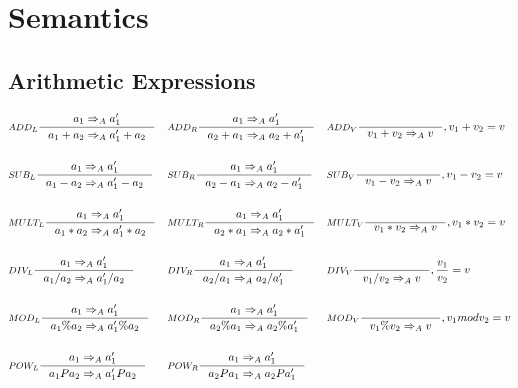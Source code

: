\section{Semantics}
\subsection{Arithmetic Expressions}
\begin{align*}
&\inference[$ADD_L$]{a_1 \Rightarrow_A a_1'}
                    {a_1 + a_2 \Rightarrow_A a_1' + a_2}
&
&\inference[$ADD_R$]{a_1 \Rightarrow_A a_1'}
										{a_2 + a_1 \Rightarrow_A a_2 + a_1'}
&
&\inference[$ADD_V$]{}
                    {v_1 + v_2 \Rightarrow_A v}
										{, v_1 + v_2 = v}
\\\\
&\inference[$SUB_L$]{a_1 \Rightarrow_A a_1'}
                    {a_1 - a_2 \Rightarrow_A a_1' - a_2}
&
&\inference[$SUB_R$]{a_1 \Rightarrow_A a_1'}
                    {a_2 - a_1 \Rightarrow_A a_2 - a_1'}
&
&\inference[$SUB_V$]{}
                    {v_1 - v_2 \Rightarrow_A v}
										{, v_1 - v_2 = v}
\\\\
&\inference[$MULT_L$]{a_1 \Rightarrow_A a_1'}
                     {a_1 * a_2 \Rightarrow_A a_1' * a_2}
&
&\inference[$MULT_R$]{a_1 \Rightarrow_A a_1'}
                     {a_2 * a_1 \Rightarrow_A a_2 * a_1'}
&
&\inference[$MULT_V$]{}
                     {v_1 * v_2 \Rightarrow_A v}
										 {, v_1 * v_2 = v}
\\\\
&\inference[$DIV_L$]{a_1 \Rightarrow_A a_1'}
                    {a_1 / a_2 \Rightarrow_A a_1' / a_2}
&
&\inference[$DIV_R$]{a_1 \Rightarrow_A a_1'}
                    {a_2 / a_1 \Rightarrow_A a_2 / a_1'}
&
&\inference[$DIV_V$]{}
                    {v_1 / v_2 \Rightarrow_A v}
										{, \frac{v_1}{v_2} = v}
\\\\
&\inference[$MOD_L$]{a_1 \Rightarrow_A a_1'}
                    {a_1 \% a_2 \Rightarrow_A a_1' \% a_2}
&
&\inference[$MOD_R$]{a_1 \Rightarrow_A a_1'}
                    {a_2 \% a_1 \Rightarrow_A a_2 \% a_1'}
&
&\inference[$MOD_V$]{}
                    {v_1 \% v_2 \Rightarrow_A v}
										{, v_1 mod v_2 = v}
\\\\
&\inference[$POW_L$]{a_1  \Rightarrow_A a_1'}
                    {a_1 P a_2 \Rightarrow_A a_1' P a_2}
&
&\inference[$POW_R$]{a_1 \Rightarrow_A a_1'}
                    {a_2 P a_1 \Rightarrow_A a_2 P a_1'}

\end{align*}
